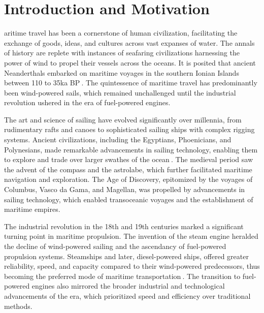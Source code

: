 \let\textcircled=\pgftextcircled
\chapter{Introduction and Motivation}\label{chap:intro}

aritime travel has been a cornerstone of human civilization, facilitating the exchange of goods, ideas, and cultures across vast expanses of water. The annals of history are replete with instances of seafaring civilizations harnessing the power of wind to propel their vessels across the oceans. It is posited that ancient Neanderthals embarked on maritime voyages in the southern Ionian Islands between 110 to 35ka BP$~$\cite{Ferentinos2012}. The quintessence of maritime travel has predominantly been wind-powered sails, which remained unchallenged until the industrial revolution ushered in the era of fuel-powered engines.

The art and science of sailing have evolved significantly over millennia, from rudimentary rafts and canoes to sophisticated sailing ships with complex rigging systems. Ancient civilizations, including the Egyptians, Phoenicians, and Polynesians, made remarkable advancements in sailing technology, enabling them to explore and trade over larger swathes of the ocean$~$\cite{casson1995ships}. The medieval period saw the advent of the compass and the astrolabe, which further facilitated maritime navigation and exploration. The Age of Discovery, epitomized by the voyages of Columbus, Vasco da Gama, and Magellan, was propelled by advancements in sailing technology, which enabled transoceanic voyages and the establishment of maritime empires.

The industrial revolution in the 18th and 19th centuries marked a significant turning point in maritime propulsion. The invention of the steam engine heralded the decline of wind-powered sailing and the ascendancy of fuel-powered propulsion systems. Steamships and later, diesel-powered ships, offered greater reliability, speed, and capacity compared to their wind-powered predecessors, thus becoming the preferred mode of maritime transportation$~$\cite{gardiner1993advent}. The transition to fuel-powered engines also mirrored the broader industrial and technological advancements of the era, which prioritized speed and efficiency over traditional methods.

